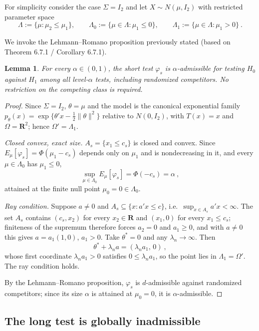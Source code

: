 \documentclass[12pt]{article}
\newtheorem{lemma}{Lemma}
\theoremstyle{definition}
\theoremstyle{remark}
\begin{document}
For simplicity consider the case $\Sigma=I_2$ and let $X\sim N(\mu,I_2)$ with restricted parameter space
\[
\Lambda:=\{\mu:\mu_2\le\mu_1\},\qquad
\Lambda_0:=\{\mu\in\Lambda:\mu_1\le0\},\qquad
\Lambda_1:=\{\mu\in\Lambda:\mu_1>0\}~.
\]
 
We invoke the Lehmann--Romano proposition previously stated (based on Theorem 6.7.1 / Corollary 6.7.1).
 
\begin{lemma}
For every $\alpha\in(0,1)$, the short test $\varphi_s$ is $\alpha$-admissible for testing $H_0$ against $H_1$ among all level-$\alpha$ tests, including randomized competitors. No restriction on the competing class is required.
\end{lemma}
 
\begin{proof}
Since $\Sigma=I_2$, $\theta=\mu$ and the model is the canonical exponential family $p_\theta(x)=\exp\{\theta'x-\tfrac12\|\theta\|^2\}$ relative to $N(0,I_2)$, with $T(x)=x$ and $\Omega=\mathbf R^2$; hence $\Omega'=\Lambda_1$.
 
\emph{Closed convex, exact size.} $A_s=\{x_1\le c_s\}$ is closed and convex. Since $E_\mu[\varphi_s]=\Phi(\mu_1-c_s)$ depends only on $\mu_1$ and is nondecreasing in it, and every $\mu\in\Lambda_0$ has $\mu_1\le0$,
\[
\sup_{\mu\in\Lambda_0}E_\mu[\varphi_s]=\Phi(-c_s)=\alpha~,
\]
attained at the finite null point $\mu_0=0\in\Lambda_0$.
 
\emph{Ray condition.} Suppose $a\ne0$ and $A_s\subseteq\{x:a'x\le c\}$, i.e.\ $\sup_{x\in A_s}a'x<\infty$. The set $A_s$ contains $(c_s,x_2)$ for every $x_2\in\mathbf R$ and $(x_1,0)$ for every $x_1\le c_s$; finiteness of the supremum therefore forces $a_2=0$ and $a_1\ge0$, and with $a\ne0$ this gives $a=a_1(1,0)$, $a_1>0$. Take $\theta^*=0$ and any $\lambda_n\to\infty$. Then
\[
\theta^*+\lambda_n a=(\lambda_n a_1,\,0)~,
\]
whose first coordinate $\lambda_n a_1>0$ satisfies $0\le\lambda_n a_1$, so the point lies in $\Lambda_1=\Omega'$. The ray condition holds.
 
By the Lehmann--Romano proposition, $\varphi_s$ is $d$-admissible against randomized competitors; since its size $\alpha$ is attained at $\mu_0=0$, it is $\alpha$-admissible. 
\end{proof}

\subsection*{The long test is globally inadmissible}
\end{document}
